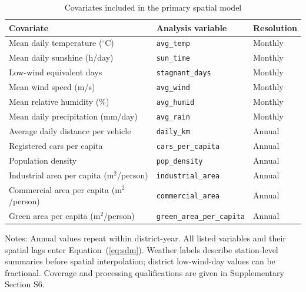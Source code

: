\begin{table}[htbp]
\centering
\caption{Covariates included in the primary spatial model}
\label{tab:covariates}
\small\setlength{\tabcolsep}{3pt}
\revisioncolor
\begin{tabularx}{\linewidth}{@{}Xll@{}}
\toprule
Covariate & Analysis variable & Resolution\\
\midrule
Mean daily temperature ($^\circ$C) & \texttt{avg\_temp} & Monthly\\
Mean daily sunshine (h/day) & \texttt{sun\_time} & Monthly\\
Low-wind equivalent days & \texttt{stagnant\_days} & Monthly\\
Mean wind speed (m/s) & \texttt{avg\_wind} & Monthly\\
Mean relative humidity (\%) & \texttt{avg\_humid} & Monthly\\
Mean daily precipitation (mm/day) & \texttt{avg\_rain} & Monthly\\
Average daily distance per vehicle & \texttt{daily\_km} & Annual\\
Registered cars per capita & \texttt{cars\_per\_capita} & Annual\\
Population density & \texttt{pop\_density} & Annual\\
Industrial area per capita (m$^2$/person) & \texttt{industrial\_area} & Annual\\
Commercial area per capita (m$^2$/person) & \texttt{commercial\_area} & Annual\\
Green area per capita (m$^2$/person) & \texttt{green\_area\_per\_capita} & Annual\\
\bottomrule
\end{tabularx}
\begin{flushleft}\footnotesize\revisioncolor
Notes: Annual values repeat within district-year. All listed variables and their spatial lags enter Equation~(\ref{eq:sdm}). Weather labels describe station-level summaries before spatial interpolation; district low-wind-day values can be fractional. Coverage and processing qualifications are given in Supplementary Section S6.
\end{flushleft}
\end{table}
